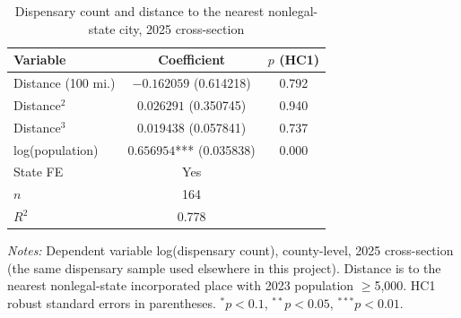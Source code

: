 \begin{table}[htbp]
\centering
\caption{Dispensary count and distance to the nearest nonlegal-state city, 2025 cross-section}
\label{tab:city_distance_doseresponse}
\small
\begin{tabular}{lcc}
\toprule
Variable & Coefficient & $p$ (HC1) \\
\midrule
Distance (100 mi.) & $-0.162059$ (0.614218) & 0.792 \\
Distance$^2$ & $0.026291$ (0.350745) & 0.940 \\
Distance$^3$ & $0.019438$ (0.057841) & 0.737 \\
log(population) & $0.656954$*** (0.035838) & 0.000 \\
\midrule
State FE & Yes & \\
$n$ & 164 & \\
$R^2$ & 0.778 & \\
\bottomrule
\end{tabular}
\begin{minipage}{0.85\textwidth}
\vspace{0.3em}
\footnotesize
\textit{Notes:} Dependent variable log(dispensary count), county-level, 2025 cross-section (the same
dispensary sample used elsewhere in this project). Distance is to the nearest nonlegal-state incorporated
place with 2023 population $\geq$5,000. HC1 robust standard errors in parentheses.
$^{*}p<0.1$, $^{**}p<0.05$, $^{***}p<0.01$.
\end{minipage}
\end{table}
